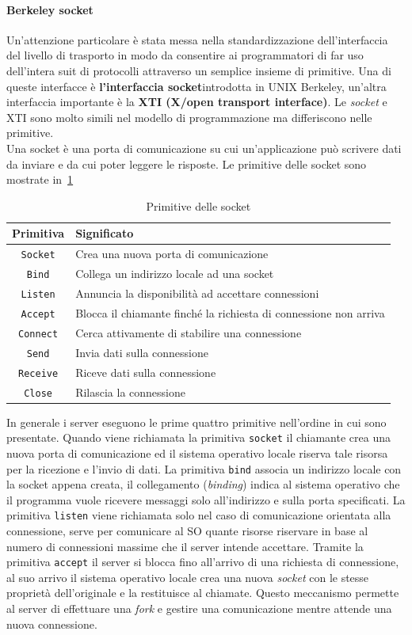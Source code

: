 \paragraph{Berkeley socket}
Un'attenzione particolare è stata messa nella standardizzazione dell'interfaccia del livello di trasporto in modo da consentire ai programmatori di far uso dell'intera suit di protocolli attraverso un semplice insieme di primitive.
Una di queste interfacce è \textbf{l'interfaccia socket}introdotta in UNIX Berkeley, un'altra interfaccia importante è la \textbf{XTI (X/open transport interface)}. Le \emph{socket} e XTI sono molto simili nel modello di programmazione ma differiscono nelle primitive.\\
Una socket è una porta di comunicazione su cui un'applicazione può scrivere dati da inviare e da cui poter leggere le risposte.
Le primitive delle socket sono mostrate in \tablename\,\ref{tab:socket}
\begin{table}
\centering
\begin{tabular}{|c|l|}
\hline
\textbf{Primitiva} & \textbf{Significato} \\
\hline
\texttt{Socket} & Crea una nuova porta di comunicazione \\
\texttt{Bind} & Collega un indirizzo locale ad una socket\\
\texttt{Listen} & Annuncia la disponibilità ad accettare connessioni\\
\texttt{Accept} & Blocca il chiamante finché la richiesta di connessione non arriva\\
\texttt{Connect} & Cerca attivamente di stabilire una connessione\\
\texttt{Send} & Invia dati sulla connessione\\
\texttt{Receive} & Riceve dati sulla connessione\\
\texttt{Close} & Rilascia la connessione\\
\hline
\end{tabular}
\caption{Primitive delle socket}\label{tab:socket}
\end{table}
In generale i server eseguono le prime quattro primitive nell'ordine in cui sono presentate. Quando viene richiamata la primitiva \texttt{socket} il chiamante crea una nuova porta di comunicazione ed il sistema operativo locale riserva tale risorsa per la ricezione e l'invio di dati. La primitiva \texttt{bind} associa un indirizzo locale con la socket appena creata, il collegamento (\emph{binding}) indica al sistema operativo che il programma vuole ricevere messaggi solo all'indirizzo e sulla porta specificati. La primitiva \texttt{listen} viene richiamata solo nel caso di comunicazione orientata alla connessione, serve per comunicare al SO quante risorse riservare in base al numero di connessioni massime che il server intende accettare. Tramite la primitiva \texttt{accept} il server si blocca fino all'arrivo di una richiesta di connessione, al suo arrivo il sistema operativo locale crea una nuova \emph{socket} con le stesse proprietà dell'originale e la restituisce al chiamate. Questo meccanismo permette al server di effettuare una \emph{fork} e gestire una comunicazione mentre attende una nuova connessione.\\
